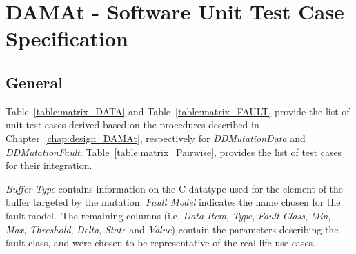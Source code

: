 
\chapter{DAMAt - Software Unit Test Case Specification}
\label{chap:spec_DAMAt}

\section{General}

Table~\ref{table:matrix_DATA} and Table~\ref{table:matrix_FAULT} provide the list of unit test cases derived based on the procedures described in Chapter~\ref{chap:design_DAMAt}, respectively for \emph{DDMutationData} and \emph{DDMutationFault}.
Table~\ref{table:matrix_Pairwise}, provides the list of test cases for their integration.

\emph{Buffer Type} contains information on the C datatype used for the element of the buffer targeted by the mutation.
\emph{Fault Model} indicates the name chosen for the fault model.\
The remaining columns (i.e. \emph{Data Item}, \emph{Type}, \emph{Fault Class}, \emph{Min}, \emph{Max}, \emph{Threshold}, \emph{Delta}, \emph{State}  and \emph{Value}) contain the parameters describing the fault class, and were chosen to be representative of the real life use-cases.







